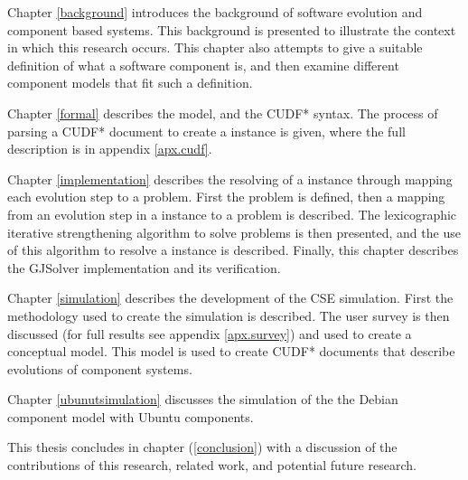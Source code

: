 Chapter \ref{background} introduces the background of software evolution and component based systems.
This background is presented to illustrate the context in which this research occurs.
This chapter also attempts to give a suitable definition of what a software component is, and then examine different component models that fit such a definition.

Chapter \ref{formal} describes the \modelname model, and the CUDF* syntax.
The process of parsing a CUDF* document to create a \modelname instance is given, where the full description is in appendix \ref{apx.cudf}.

Chapter \ref{implementation} describes the resolving of a \modelname instance through mapping each evolution step to a \modelimpl problem.
First the \modelimpl problem is defined, then a mapping from an evolution step in a \modelname instance to a \modelimpl problem is described.
The lexicographic iterative strengthening algorithm to solve \modelimpl problems is then presented, and the use of this algorithm to resolve a \modelname instance is described.
Finally, this chapter describes the GJSolver implementation and its verification.

Chapter \ref{simulation} describes the development of the CSE simulation.
First the methodology used to create the simulation is described.
The user survey is then discussed (for full results see appendix \ref{apx.survey}) and used to create a conceptual model.
This model is used to create CUDF* documents that describe evolutions of component systems. 

Chapter \ref{ubunutsimulation} discusses the simulation of the  the Debian component model \citep{Barth2005} with Ubuntu  components. 

This thesis concludes in chapter (\ref{conclusion}) with a discussion of the contributions of this research, related work, and potential future research.
